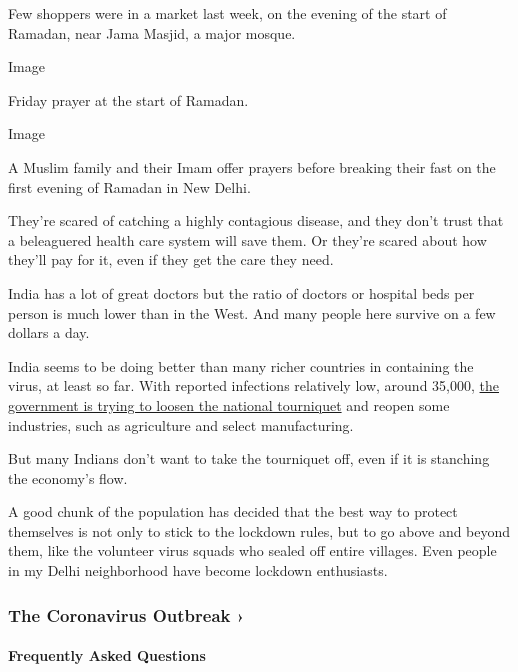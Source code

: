 Few shoppers were in a market last week, on the evening of the start of
Ramadan, near Jama Masjid, a major mosque.~

Image

Friday prayer at the start of Ramadan.

Image

A Muslim family and their Imam offer prayers before breaking their fast
on the first evening of Ramadan in New Delhi.

They're scared of catching a highly contagious disease, and they don't
trust that a beleaguered health care system will save them. Or they're
scared about how they'll pay for it, even if they get the care they
need.

India has a lot of great doctors but the ratio of doctors or hospital
beds per person is much lower than in the West. And many people here
survive on a few dollars a day.

India seems to be doing better than many richer countries in containing
the virus, at least so far. With reported infections relatively low,
around 35,000,
\href{https://www.nytimes.com/2020/04/28/world/asia/india-coronavirus-lockdown.html}{the
government is trying to loosen the national tourniquet} and reopen some
industries, such as agriculture and select manufacturing.

But many Indians don't want to take the tourniquet off, even if it is
stanching the economy's flow.

A good chunk of the population has decided that the best way to protect
themselves is not only to stick to the lockdown rules, but to go above
and beyond them, like the volunteer virus squads who sealed off entire
villages. Even people in my Delhi neighborhood have become lockdown
enthusiasts.

\href{https://www.nytimes.com/news-event/coronavirus?action=click\&pgtype=Article\&state=default\&region=MAIN_CONTENT_3\&context=storylines_faq}{}

\hypertarget{the-coronavirus-outbreak-}{%
\subsubsection{The Coronavirus Outbreak
›}\label{the-coronavirus-outbreak-}}

\hypertarget{frequently-asked-questions}{%
\paragraph{Frequently Asked
Questions}\label{frequently-asked-questions}}


